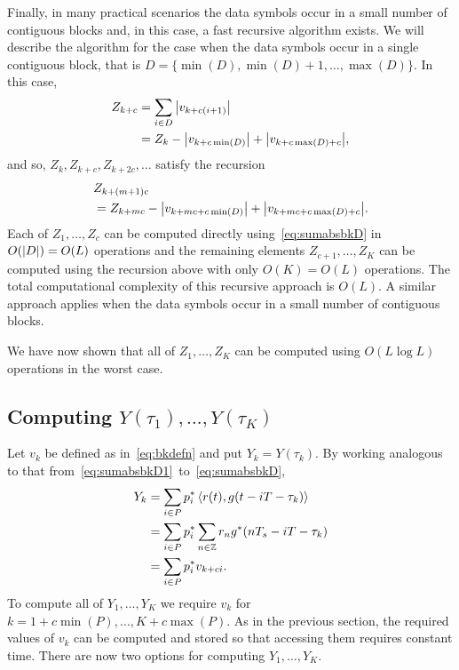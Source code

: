 \documentclass[journal]{IEEEtranTCOM}
\begin{document}
Finally, in many practical scenarios the data symbols occur in a small number of contiguous blocks and, in this case, a fast recursive algorithm exists.  We will describe the algorithm for the case when the data symbols occur in a single contiguous block, that is $D = \{ \min(D), \min(D)+1, \dots, \max(D) \}$.  In this case,
\begin{align*}
Z_{k+c} &= \sum_{i \in D} {\left\vert v_{k+c(i+1)} \right\vert} \\
&= Z_{k} - {\left\vert v_{k+c\min(D)} \right\vert} + {\left\vert v_{k+c\max(D) + c} \right\vert},
\end{align*}
and so, $Z_k, Z_{k+c}, Z_{k+2c}, \dots$ satisfy the recursion
\begin{align}
&Z_{k+(m+1)c} \nonumber \\
&= Z_{k+mc} - \abs{v_{k+mc + c\min(D)}} + \abs{v_{k+ mc + c\max(D)+c}}. \label{eq:Zrecursive}
\end{align}
Each of $Z_1, \dots, Z_{c}$ can be computed directly using~\eqref{eq:sumabsbkD} in $O({\left\vert D \right\vert}) = O(L)$ operations and the remaining elements $Z_{c+1}, \dots, Z_{K}$ can be computed using the recursion above with only $O(K) = O(L)$ operations.  The total computational complexity of this recursive approach is $O(L)$.  A similar approach applies when the data symbols occur in a small number of contiguous blocks.

We have now shown that all of $Z_1,\dots,Z_K$ can be computed using $O(L\log L)$ operations in the worst case.

\subsection{Computing $Y(\tau_1), \dots, Y(\tau_K)$}\label{sec:comp-ytau_1-dots}

Let $v_k$ be defined as in~\eqref{eq:bkdefn} and put $Y_k = Y(\tau_k)$.  By working analogous to that from~\eqref{eq:sumabsbkD1}~to~\eqref{eq:sumabsbkD},
\begin{align}
Y_k &= \sum_{i \in P} p_i^* \dotprod{r(t)}{g(t - iT - \tau_k)} \nonumber \\
&= \sum_{i \in P} p_i^* \sum_{n\in \ints} r_ng^*(nT_s - iT - \tau_k) \nonumber  \\
&= \sum_{i \in P} p_i^* v_{k+ci}. \label{eq:Yksumdirect}
\end{align}
To compute all of $Y_1, \dots, Y_K$ we require $v_k$ for $k = 1 + c\min(P), \dots, K + c\max(P)$.  As in the previous section, the required values of $v_k$ can be computed and stored so that accessing them requires constant time.  There are now two options for computing $Y_1, \dots, Y_K$.
\end{document}
